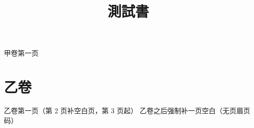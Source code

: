 \documentclass{ltc-cn-vbook}
\title{測試書}
\begin{document}
\begin{正文}
甲卷第一页
\clearpage
\chapter*{乙卷}
乙卷第一页（第 2 页补空白页，第 3 页起）
乙卷之后强制补一页空白（无页眉页码）
\end{正文}
\end{document}

